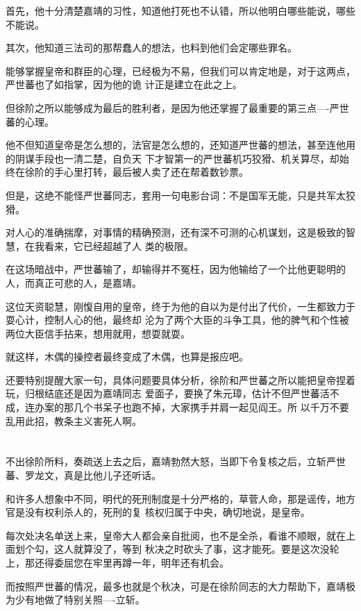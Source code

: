 \documentclass[11pt,a4paper,onecolumn]{article}
\begin{document}
首先，他十分清楚嘉靖的习性，知道他打死也不认错，所以他明白哪些能说，哪些不能说。

其次，他知道三法司的那帮蠢人的想法，也料到他们会定哪些罪名。

能够掌握皇帝和群臣的心理，已经极为不易，但我们可以肯定地是，对于这两点，严世蕃也了如指掌，因为他的诡
计正是建立在此之上。

但徐阶之所以能够成为最后的胜利者，是因为他还掌握了最重要的第三点----严世蕃的心理。

他不但知道皇帝是怎么想的，法官是怎么想的，还知道严世蕃的想法，甚至连他用的阴谋手段也一清二楚，自负天
下才智第一的严世蕃机巧狡猾、机关算尽，却始终在徐阶的手心里打转，最后被人卖了还在帮着数钞票。

但是，这绝不能怪严世蕃同志，套用一句电影台词：不是国军无能，只是共军太狡猾。

对人心的准确揣摩，对事情的精确预测，还有深不可测的心机谋划，这是极致的智慧，在我看来，它已经超越了人
类的极限。

在这场暗战中，严世蕃输了，却输得并不冤枉，因为他输给了一个比他更聪明的人，而真正可悲的人，是嘉靖。

这位天资聪慧，刚愎自用的皇帝，终于为他的自以为是付出了代价，一生都致力于耍心计，控制人心的他，最终却
沦为了两个大臣的斗争工具，他的脾气和个性被两位大臣信手拈来，想用就用，想耍就耍。

就这样，木偶的操控者最终变成了木偶，也算是报应吧。

还要特别提醒大家一句，具体问题要具体分析，徐阶和严世蕃之所以能把皇帝捏着玩，归根结底还是因为嘉靖同志
爱面子，要换了朱元璋，估计不但严世蕃活不成，连办案的那几个书呆子也跑不掉，大家携手并肩一起见阎王。所
以千万不要乱用此招，教条主义害死人啊。

\section[\thesection]{}

不出徐阶所料，奏疏送上去之后，嘉靖勃然大怒，当即下令复核之后，立斩严世蕃、罗龙文，真是比他儿子还听话。

和许多人想象中不同，明代的死刑制度是十分严格的，草菅人命，那是谣传，地方官是没有权利杀人的，死刑的复
核权归属于中央，确切地说，是皇帝。

每次处决名单送上来，皇帝大人都会亲自批阅，也不是全杀，看谁不顺眼，就在上面划个勾，这人就算没了，等到
秋决之时砍头了事，这才能死。要是这次没轮上，那还得委屈您在牢里再蹲一年，明年还有机会。

而按照严世蕃的情况，最多也就是个秋决，可是在徐阶同志的大力帮助下，嘉靖极为少有地做了特别关照----立斩。
\end{document}
